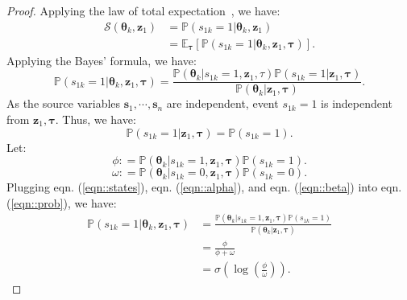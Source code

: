 \documentclass[10pt,journal,compsoc]{IEEEtran}
\begin{document}
\begin{proof}
Applying the law of total expectation~\cite{montgomery2010applied}, we have:
\begin{equation}
    \begin{aligned}
\mathcal{S}({\bm{\theta}_k},{\bm{z}_1}) &= \mathbb{P}({s_{1k}} = 1|{\bm{\theta}_k},{\bm{z}_1})\\
\quad \quad \quad \;\; &= {\mathbb{E}_{\bm{\tau}} }[\mathbb{P}({s_{1k}} = 1|{\bm{\theta} _k},{\bm{z}_1},\bm{\tau} )].
\end{aligned}
\end{equation}
Applying the Bayes' formula, we have:
\begin{equation}\label{eqn::prob}
    \mathbb{P}({s_{1k}} = 1|{\bm{\theta} _k},{\bm{z}_1},\bm{\tau} ) = \frac{{\mathbb{P}({\bm{\theta} _k}|{s_{1k}} = 1,{\bm{z}_1},\tau )\mathbb{P}({s_{1k}} = 1|{\bm{z}_1},\bm{\tau} )}}{{\mathbb{P}({\bm{\theta} _k}|{\bm{z}_1},\bm{\tau} )}}.
\end{equation}
As the source variables $\bm{s}_1, \cdots, \bm{s}_n$ are independent, event $s_{1k}=1$ is independent from $\bm{z}_1, \bm{\tau}$. Thus, we have:
\begin{equation}\label{eqn::states}
    \mathbb{P}({s_{1k}} = 1|{\bm{z}_1},\bm{\tau} ) = \mathbb{P}({s_{1k}} = 1).
\end{equation}
Let:
\begin{equation}\label{eqn::alpha}
    \phi : = \mathbb{P}({\bm{\theta} _k}|{s_{1k}} = 1,{\bm{z}_1},\bm{\tau} )\mathbb{P}({s_{1k}} = 1).
\end{equation}
\begin{equation}\label{eqn::beta}
    \omega : = \mathbb{P}({\bm{\theta} _k}|{s_{1k}} = 0,{\bm{z}_1},\bm{\tau} )\mathbb{P}({s_{1k}} = 0).
\end{equation}
Plugging eqn. (\ref{eqn::states}), eqn. (\ref{eqn::alpha}), and eqn. (\ref{eqn::beta}) into eqn. (\ref{eqn::prob}), we have:
\begin{equation}
\begin{aligned}
\mathbb{P}({s_{1k}} = 1|{\bm{\theta} _k},{\bm{z}_1},\bm{\tau} ) &= \frac{{\mathbb{P}({\bm{\theta} _k}|{s_{1k}} = 1,{\bm{z}_1},\bm{\tau} )\mathbb{P}({s_{1k}} = 1)}}{{\mathbb{P}({\bm{\theta} _k}|{\bm{z}_1},\bm{\tau} )}}\\ 
\quad \quad \quad \quad \quad \quad \quad \; &= \frac{\phi }{{\phi  + \omega }}\\ 
\quad \quad \quad \quad \quad \quad \quad \; &= \sigma \left( {\log \left(\frac{\phi }{\omega }\right)} \right).
\end{aligned}

\end{equation}
\end{proof}
\end{document}
